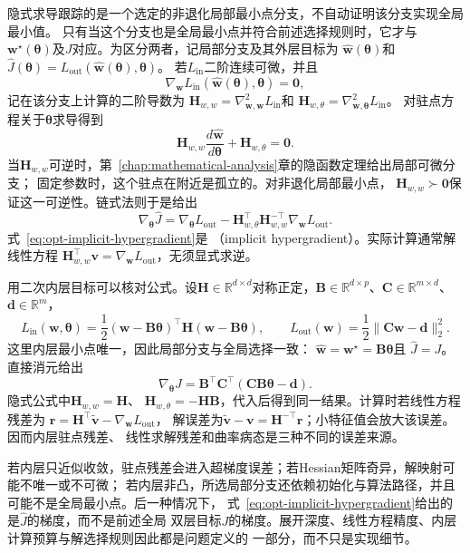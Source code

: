 隐式求导跟踪的是一个选定的非退化局部最小点分支，不自动证明该分支实现全局最小值。
只有当这个分支也是全局最小点并符合前述选择规则时，它才与
$\bm{w}^{\star}(\bm{\theta})$及$J$对应。为区分两者，记局部分支及其外层目标为
$\widehat{\bm{w}}(\bm{\theta})$和
$\widehat{J}(\bm{\theta})
=L_{\mathrm{out}}(\widehat{\bm{w}}(\bm{\theta}),\bm{\theta})$。
若$L_{\mathrm{in}}$二阶连续可微，并且
\[
  \nabla_{\bm{w}}L_{\mathrm{in}}
  (\widehat{\bm{w}}(\bm{\theta}),\bm{\theta})=\bm{0},
\]
记在该分支上计算的二阶导数为
$\bm{H}_{w,w}=\nabla_{\bm{w},\bm{w}}^2L_{\mathrm{in}}$和
$\bm{H}_{w,\theta}=\nabla_{\bm{w},\bm{\theta}}^2L_{\mathrm{in}}$。
对驻点方程关于$\bm{\theta}$求导得到
\[
  \bm{H}_{w,w}\frac{d\widehat{\bm{w}}}{d\bm{\theta}}
  +\bm{H}_{w,\theta}=\bm{0}.
\]
当$\bm{H}_{w,w}$可逆时，第~\ref{chap:mathematical-analysis}章的隐函数定理给出局部可微分支；
固定参数时，这个驻点在附近是孤立的。对非退化局部最小点，
$\bm{H}_{w,w}\succ\bm{0}$保证这一可逆性。链式法则于是给出
\begin{equation}
  \nabla_{\bm{\theta}}\widehat{J}
  =
  \nabla_{\bm{\theta}}L_{\mathrm{out}}
  -\bm{H}_{w,\theta}^{\top}
  \bm{H}_{w,w}^{-\top}
  \nabla_{\bm{w}}L_{\mathrm{out}}.
  \label{eq:opt-implicit-hypergradient}
\end{equation}
式~\eqref{eq:opt-implicit-hypergradient}是
（implicit hypergradient）。实际计算通常解线性方程
$\bm{H}_{w,w}^{\top}\bm{v}=\nabla_{\bm{w}}L_{\mathrm{out}}$，无须显式求逆。

用二次内层目标可以核对公式。设$\bm H\in\mathbb R^{d\times d}$对称正定，$\bm B\in\mathbb R^{d\times p}$、$\bm C\in\mathbb R^{m\times d}$、$\bm d\in\mathbb R^m$，
\[
  L_{\mathrm{in}}(\bm{w},\bm{\theta})
  =\frac12(\bm{w}-\bm{B}\bm{\theta})^{\top}
  \bm{H}(\bm{w}-\bm{B}\bm{\theta}),\qquad
  L_{\mathrm{out}}(\bm{w})
  =\frac12\lVert\bm{C}\bm{w}-\bm{d}\rVert_2^2.
\]
这里内层最小点唯一，因此局部分支与全局选择一致：
$\widehat{\bm{w}}=\bm{w}^{\star}=\bm{B}\bm{\theta}$且
$\widehat{J}=J$。直接消元给出
\[
  \nabla_{\bm{\theta}}J
  =\bm{B}^{\top}\bm{C}^{\top}
  (\bm{C}\bm{B}\bm{\theta}-\bm{d}).
\]
隐式公式中$\bm{H}_{w,w}=\bm{H}$、
$\bm{H}_{w,\theta}=-\bm{H}\bm{B}$，代入后得到同一结果。计算时若线性方程残差为
$\bm r=\bm H^\top\widetilde{\bm v}-\nabla_{\bm w}L_{\mathrm{out}}$，
解误差为$\widetilde{\bm v}-\bm v=\bm{H}^{-\top}\bm{r}$；小特征值会放大该误差。因而内层驻点残差、
线性求解残差和曲率病态是三种不同的误差来源。

若内层只近似收敛，驻点残差会进入超梯度误差；若Hessian矩阵奇异，解映射可能不唯一或不可微；
若内层非凸，所选局部分支还依赖初始化与算法路径，并且可能不是全局最小点。后一种情况下，
式~\eqref{eq:opt-implicit-hypergradient}给出的是$\widehat{J}$的梯度，而不是前述全局
双层目标$J$的梯度。展开深度、线性方程精度、内层计算预算与解选择规则因此都是问题定义的
一部分，而不只是实现细节。

